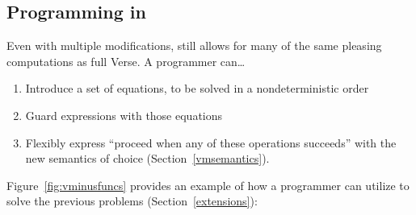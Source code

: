 \documentclass[manuscript,screen,review, 12pt, nonacm]{acmart}
\begin{document}
    \subsection{Programming in \VMinus}

    Even with multiple modifications, \VMinus still allows for many of the same
    pleasing computations as full Verse. A programmer can\dots
        \begin{enumerate}
            \item Introduce a set of equations, to be solved in a
            nondeterministic order 
            \item Guard expressions with those equations 
            \item Flexibly express “proceed when any of these operations
            succeeds” with the new semantics of choice
            (Section~\ref{vmsemantics}). 
        \end{enumerate}

    Figure~\ref{fig:vminusfuncs} provides an example of how a programmer can
    utilize \VMinus to solve the previous problems (Section~\ref{extensions}): 
    
\end{document}
